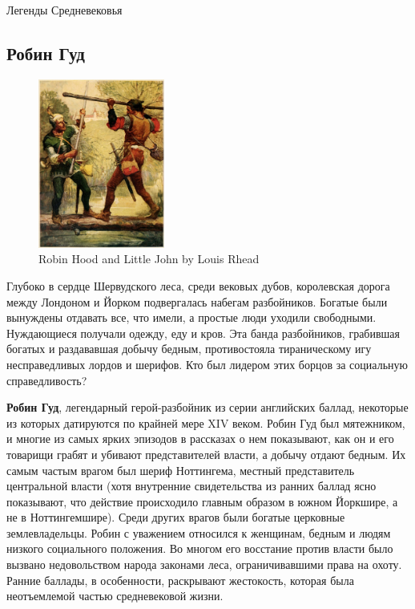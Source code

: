 




\begin{center}
    {
        \textcolor{bordercol}{\fontsize{36pt}{40pt}\selectfont Легенды Средневековья}
    }
\end{center}

\subsection*{Робин Гуд}

\begin{figure}
    \centering
    \includegraphics[width=0.37\textwidth]{Robin_Hood_and_Little_John-scaled.jpg}
    \caption{Robin Hood and Little John by Louis Rhead}
\end{figure}

Глубоко в сердце Шервудского леса, среди вековых дубов, королевская
дорога между Лондоном и Йорком подвергалась набегам разбойников.
Богатые были вынуждены отдавать все, что имели, а простые люди
уходили свободными. Нуждающиеся получали одежду, еду и кров. Эта
банда разбойников, грабившая богатых и раздававшая добычу бедным,
противостояла тираническому игу несправедливых лордов и шерифов.
Кто был лидером этих борцов за социальную справедливость?

\textbf{Робин Гуд}, легендарный герой-разбойник из серии английских
баллад, некоторые из которых датируются по крайней мере XIV веком.
Робин Гуд был мятежником, и многие из самых ярких эпизодов в
рассказах о нем показывают, как он и его товарищи грабят и убивают
представителей власти, а добычу отдают бедным. Их самым частым
врагом был шериф Ноттингема, местный представитель центральной
власти (хотя внутренние свидетельства из ранних баллад ясно
показывают, что действие происходило главным образом в южном
Йоркшире, а не в Ноттингемшире). Среди других врагов были богатые
церковные землевладельцы. Робин с уважением относился к женщинам,
бедным и людям низкого социального положения. Во многом его
восстание против власти было вызвано недовольством народа законами
леса, ограничивавшими права на охоту. Ранние баллады, в особенности,
раскрывают жестокость, которая была неотъемлемой частью
средневековой жизни.

